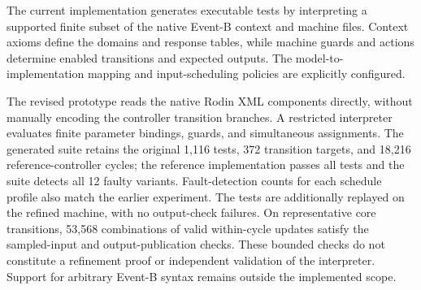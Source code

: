 The current implementation generates executable tests by interpreting a
supported finite subset of the native Event-B context and machine files.
Context axioms define the domains and response tables, while machine
guards and actions determine enabled transitions and expected outputs.
The model-to-implementation mapping and input-scheduling policies are
explicitly configured.

The revised prototype reads the native Rodin XML components directly,
without manually encoding the controller transition branches.
A restricted interpreter evaluates finite parameter bindings, guards,
and simultaneous assignments. The generated suite retains the original
1,116 tests, 372 transition targets, and 18,216 reference-controller cycles;
the reference implementation passes all tests and the suite detects all
12 faulty variants. Fault-detection counts for each schedule profile
also match the earlier experiment. The tests are additionally replayed
on the refined machine, with no output-check failures. On representative
core transitions, 53,568 combinations of valid within-cycle updates
satisfy the sampled-input and output-publication checks. These bounded
checks do not constitute a refinement proof or independent validation
of the interpreter. Support for arbitrary Event-B syntax remains outside
the implemented scope.
